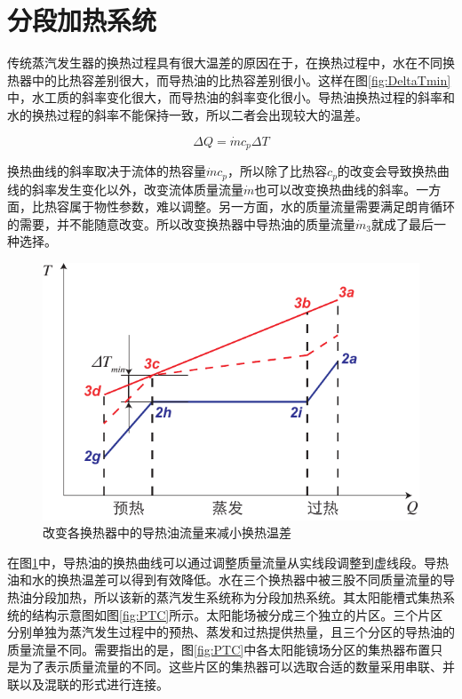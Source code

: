 \section{分段加热系统}
\label{sec:melrs}

传统蒸汽发生器的换热过程具有很大温差的原因在于，在换热过程中，水在不同换热器中的比热容差别很大，而导热油的比热容差别很小。这样在图\ref{fig:DeltaTmin}中，水工质的斜率变化很大，而导热油的斜率变化很小。导热油换热过程的斜率和水的换热过程的斜率不能保持一致，所以二者会出现较大的温差。

\begin{equation}
  \Delta Q = \dot{m} c_p\Delta T
\end{equation}

换热曲线的斜率取决于流体的热容量$\dot{m}c_p$，所以除了比热容$c_p$的改变会导致换热曲线的斜率发生变化以外，改变流体质量流量$\dot{m}$也可以改变换热曲线的斜率。一方面，比热容属于物性参数，难以调整。另一方面，水的质量流量需要满足朗肯循环的需要，并不能随意改变。所以改变换热器中导热油的质量流量$\dot{m}_3$就成了最后一种选择。

\noindent \begin{figure}[htbp]
\begin{center}
	\includegraphics[width = 0.5\columnwidth]{fig/BetterCurve}
	\caption{改变各换热器中的导热油流量来减小换热温差}
	\label{fig:BetterCurve}
\end{center}
\end{figure}

在图\ref{fig:BetterCurve}中，导热油的换热曲线可以通过调整质量流量从实线段调整到虚线段。导热油和水的换热温差可以得到有效降低。水在三个换热器中被三股不同质量流量的导热油分段加热，所以该新的蒸汽发生系统称为分段加热系统。其太阳能槽式集热系统的结构示意图如图\ref{fig:PTC}所示。太阳能场被分成三个独立的片区。三个片区分别单独为蒸汽发生过程中的预热、蒸发和过热提供热量，且三个分区的导热油的质量流量不同。需要指出的是，图\ref{fig:PTC}中各太阳能镜场分区的集热器布置只是为了表示质量流量的不同。这些片区的集热器可以选取合适的数量采用串联、并联以及混联的形式进行连接。

